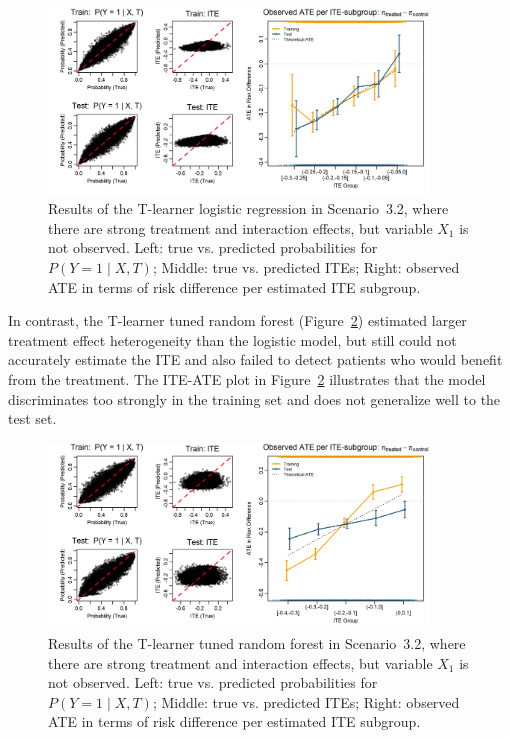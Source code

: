 \begin{figure}[htbp]
\centering
\includegraphics[width=0.9\textwidth]{img/results_ITE_simulation/unobserved_interaction_glm_tlearner.png}
\caption{Results of the T-learner logistic regression in Scenario~3.2, where there are strong treatment and interaction effects, but variable $X_1$ is not observed. Left: true vs. predicted probabilities for $P(Y = 1 \mid X, T)$; Middle: true vs. predicted ITEs; Right: observed ATE in terms of risk difference per estimated ITE subgroup.}
\label{fig:unobserved_interaction_glm_tlearner}
\end{figure}


In contrast, the T-learner tuned random forest (Figure~\ref{fig:unobserved_interaction_tuned_rf_tlearner}) estimated larger treatment effect heterogeneity than the logistic model, but still could not accurately estimate the ITE and also failed to detect patients who would benefit from the treatment. The ITE-ATE plot in Figure~\ref{fig:unobserved_interaction_tuned_rf_tlearner} illustrates that the model discriminates too strongly in the training set and does not generalize well to the test set.



\begin{figure}[htbp]
\centering
\includegraphics[width=0.9\textwidth]{img/results_ITE_simulation/unobserved_interaction_tuned_rf_tlearner.png}
\caption{Results of the T-learner tuned random forest in Scenario~3.2, where there are strong treatment and interaction effects, but variable $X_1$ is not observed. Left: true vs. predicted probabilities for $P(Y = 1 \mid X, T)$; Middle: true vs. predicted ITEs; Right: observed ATE in terms of risk difference per estimated ITE subgroup.}
\label{fig:unobserved_interaction_tuned_rf_tlearner}
\end{figure}


